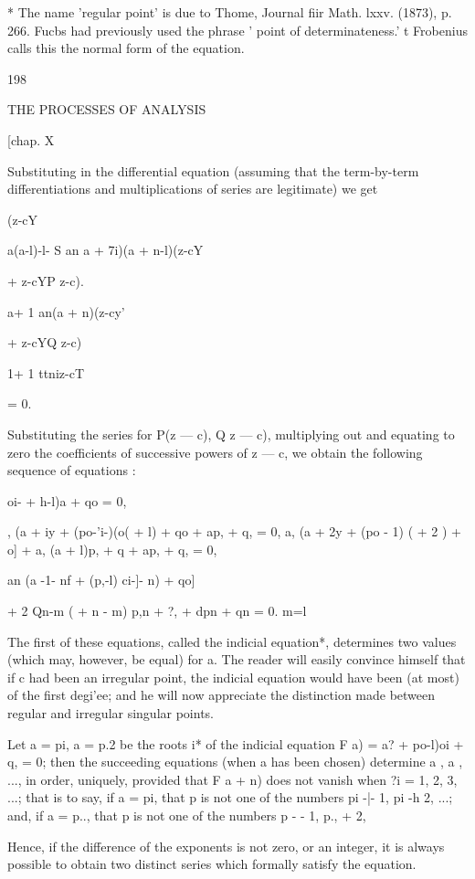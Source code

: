 * The name 'regular point' is due to Thome, Journal fiir Math. lxxv.
(1873), p. 266. Fucbs had previously used the phrase ' point of
determinateness.' t Frobenius calls this the normal form of the
equation.

198

THE PROCESSES OF ANALYSIS

[chap. X

Substituting in the differential equation (assuming that the
term-by-term differentiations and multiplications of series are
legitimate) we get

(z-cY

a(a-l)-l- S an a + 7i)(a + n-l)(z-cY

+ z-cYP z-c).

a+ 1 an(a + n)(z-cy'

+ z-cYQ z-c)

1+ 1 ttniz-cT

= 0.

Substituting the series for P(z — c), Q z — c), multiplying out and
equating to zero the coefficients of successive powers of z — c, we
obtain the following sequence of equations :

oi- + h-l)a + qo = 0,

 , (a + iy + (po-'i-)(o( + l) + qo + ap, + q, = 0, a, (a + 2y + (po -
1) ( + 2 ) + o] + a, (a + l)p, + q + ap, + q, = 0,

an (a -1- nf + (p,-l) ci-]- n) + qo]

+ 2 Qn-m ( + n - m) p,n + ?, + dpn + qn = 0. m=l

The first of these equations, called the indicial equation*,
determines two values (which may, however, be equal) for a. The reader
will easily convince himself that if c had been an irregular point,
the indicial equation would have been (at most) of the first degi'ee;
and he will now appreciate the distinction made between regular and
irregular singular points.

Let a = pi, a = p.2 be the roots i* of the indicial equation F a) = a?
+ po-l)oi + q, = 0; then the succeeding equations (when a has been
chosen) determine a , a , ..., in order, uniquely, provided that F a +
n) does not vanish when ?i = 1, 2, 3, ...; that is to say, if a = pi,
that p is not one of the numbers pi -|- 1, pi -h 2, ...; and, if a =
p.., that p is not one of the numbers p - - 1, p., + 2,

Hence, if the difference of the exponents is not zero, or an integer,
it is always possible to obtain two distinct series which formally
satisfy the equation.

